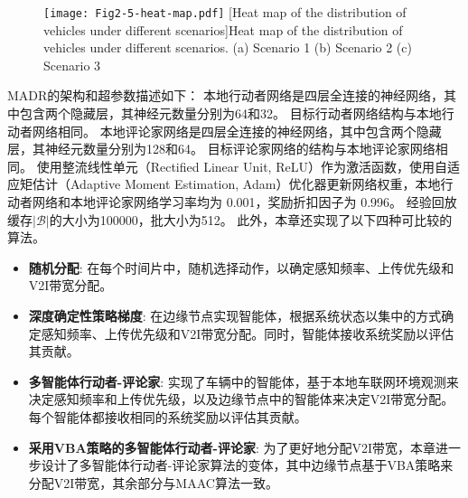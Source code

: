 \begin{figure}[h]
\centering
  \texttt{[image: Fig2-5-heat-map.pdf]}
  [Heat map of the distribution of vehicles under different scenarios]{Heat map of the distribution of vehicles under different scenarios. (a) Scenario 1 (b) Scenario 2 (c) Scenario 3}
  \label{fig 2-5}
\end{figure} 

MADR的架构和超参数描述如下：
本地行动者网络是四层全连接的神经网络，其中包含两个隐藏层，其神经元数量分别为64和32。
目标行动者网络结构与本地行动者网络相同。
本地评论家网络是四层全连接的神经网络，其中包含两个隐藏层，其神经元数量分别为128和64。
目标评论家网络的结构与本地评论家网络相同。
使用整流线性单元（Rectified Linear Unit, ReLU）作为激活函数，使用自适应矩估计（Adaptive Moment Estimation, Adam）优化器更新网络权重，本地行动者网络和本地评论家网络学习率均为 0.001，奖励折扣因子为 0.996。
经验回放缓存$|\mathcal{B}|$的大小为100000，批大小为512。
此外，本章还实现了以下四种可比较的算法。

\begin{itemize}
	\item \textbf{随机分配}: 在每个时间片中，随机选择动作，以确定感知频率、上传优先级和V2I带宽分配。
	\item \textbf{深度确定性策略梯度}\cite{mlika2022deep}: 在边缘节点实现智能体，根据系统状态以集中的方式确定感知频率、上传优先级和V2I带宽分配。同时，智能体接收系统奖励以评估其贡献。
	\item \textbf{多智能体行动者-评论家}\cite{he2021efficient}: 实现了车辆中的智能体，基于本地车联网环境观测来决定感知频率和上传优先级，以及边缘节点中的智能体来决定V2I带宽分配。每个智能体都接收相同的系统奖励以评估其贡献。
	\item \textbf{采用VBA策略的多智能体行动者-评论家}: 为了更好地分配V2I带宽，本章进一步设计了多智能体行动者-评论家算法的变体，其中边缘节点基于VBA策略来分配V2I带宽，其余部分与MAAC算法一致。
\end{itemize}

